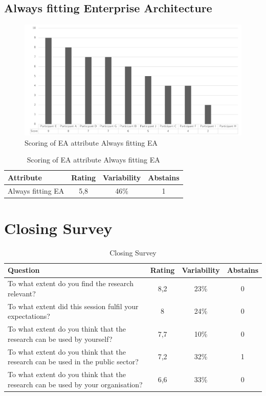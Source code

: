 \subsection{Always fitting Enterprise Architecture}
\begin{figure}[h!]
	\centering
	\includegraphics[width=0.9\linewidth]{images/scoreeaalwaysfitea}
	\caption[Scoring of EA attribute Always fitting EA]{Scoring of EA attribute Always fitting EA}
	\label{fig:appscoringeaalwaysfitea}
\end{figure}
\begin{table}[h!]
	\centering
	\begin{tabular}{p{}ccc}
		\toprule
		\textbf{Attribute} & \textbf{Rating} & \textbf{Variability} & \textbf{Abstains} \\
		\midrule
		Always fitting EA & 5,8 & 46\% & 1 \\%
		\bottomrule
	\end{tabular}%
	\caption[Scoring of EA attribute Always fitting EA]{Scoring of EA attribute Always fitting EA}
	\label{tab:appscoringeaalwaysfitea}%
\end{table}%




\section{Closing Survey}
\begin{table}[!h]
	\centering
	\begin{tabular}{p{}ccc}
		\toprule
		\textbf{Question} & \textbf{Rating} & \textbf{Variability} & \textbf{Abstains} \\
		\midrule
		To what extent do you find the research relevant? & 8,2 & 23\% & 0 \\%
		To what extent did this session fulfil your expectations? & 8 & 24\% & 0 \\%
		To what extent do you think that the research can be used by yourself? & 7,7 & 10\% & 0 \\%
		To what extent do you think that the research can be used in the public sector? & 7,2 & 32\% & 1 \\%
		To what extent do you think that the research can be used by your organisation? & 6,6 & 33\% & 0 \\%
		
		\bottomrule
	\end{tabular}%
	\caption{Closing Survey}
	\label{tab:appclosingsurvey}%
\end{table}%

